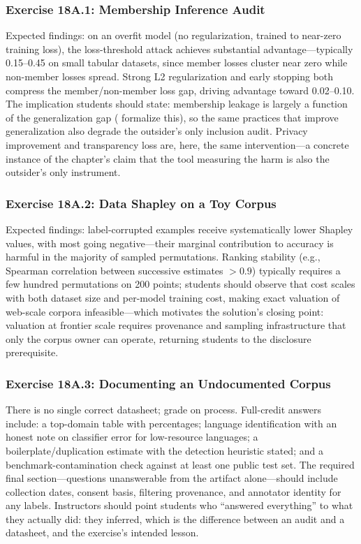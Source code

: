 \subsubsection*{Exercise 18A.1: Membership Inference Audit}

Expected findings: on an overfit model (no regularization, trained to near-zero training loss), the loss-threshold attack achieves substantial advantage---typically 0.15--0.45 on small tabular datasets, since member losses cluster near zero while non-member losses spread. Strong L2 regularization and early stopping both compress the member/non-member loss gap, driving advantage toward 0.02--0.10. The implication students should state: membership leakage is largely a function of the generalization gap (\textcite{yeom2018privacy} formalize this), so the same practices that improve generalization also degrade the outsider's only inclusion audit. Privacy improvement and transparency loss are, here, the same intervention---a concrete instance of the chapter's claim that the tool measuring the harm is also the outsider's only instrument.

\subsubsection*{Exercise 18A.2: Data Shapley on a Toy Corpus}

Expected findings: label-corrupted examples receive systematically lower Shapley values, with most going negative---their marginal contribution to accuracy is harmful in the majority of sampled permutations. Ranking stability (e.g., Spearman correlation between successive estimates $>0.9$) typically requires a few hundred permutations on 200 points; students should observe that cost scales with both dataset size and per-model training cost, making exact valuation of web-scale corpora infeasible---which motivates the solution's closing point: valuation at frontier scale requires provenance and sampling infrastructure that only the corpus owner can operate, returning students to the disclosure prerequisite.

\subsubsection*{Exercise 18A.3: Documenting an Undocumented Corpus}

There is no single correct datasheet; grade on process. Full-credit answers include: a top-domain table with percentages; language identification with an honest note on classifier error for low-resource languages; a boilerplate/duplication estimate with the detection heuristic stated; and a benchmark-contamination check against at least one public test set. The required final section---questions unanswerable from the artifact alone---should include collection dates, consent basis, filtering provenance, and annotator identity for any labels. Instructors should point students who ``answered everything'' to what they actually did: they inferred, which is the difference between an audit and a datasheet, and the exercise's intended lesson.
